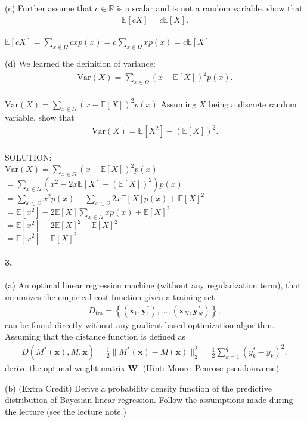 \documentclass{article}
\newcommand{\vect}[1]{\mathbf{#1}}
\newcommand{\matr}[1]{\mathbf{#1}}
\newcommand{\vx}[0]{\vect{x}}
\newcommand{\vy}[0]{\vect{y}}
\newcommand{\mW}[0]{\matr{W}}
\newcommand{\RR}[0]{\mathbb{R}}
\newcommand{\E}[0]{\mathbb{E}}
\newcommand{\tra}{\text{tra}}
\begin{document}
(c) Further assume that $c \in \RR$ is a scalar and is not a random variable, show
that
\begin{align*}
    \E\left[ cX \right] = c\E\left[X\right].
\end{align*}
\\
$\E\left[ cX \right] = \sum_{x \in \Omega} cx p(x) = c \sum_{x \in \Omega} x p(x) = c\E\left[X\right] $
\vspace{15mm}

(d) We learned the definition of variance:
\begin{align*}
    \text{Var}(X) = \sum_{x \in \Omega} (x - \E\left[ X \right])^2 p(x).
\end{align*}
\\
$\text{Var}(X) = \sum_{x \in \Omega} (x - \E\left[ X \right])^2 p(x)$
Assuming $X$ being a discrete random variable, show that
\begin{align*}
    \text{Var}(X) = \E\left[ X^2 \right] - \left(\E\left[ X \right]\right)^2.
\end{align*}
\\
SOLUTION: \\
$ \text{Var}(X) = \sum_{x \in \Omega} (x - \E\left[ X \right])^2 p(x)$ \\
$ = \sum_{x \in \Omega} (x^2 - 2x \E\left[ X \right] + (\E\left[ X \right])^2) p(x)$ \\
$= \sum_{x \in \Omega} x^2 p(x) - \sum_{x \in \Omega} 2x \E\left[ X \right] p(x) + \E\left[ X \right]^2 $ \\
$ = \E\left[  x^2 \right] - 2 \E\left[ X \right] \sum_{x \in \Omega} x  p(x) + \E\left[ X \right]^2$ \\
$= \E\left[  x^2 \right] - 2 \E\left[ X \right]^2 + \E\left[ X \right]^2$ \\
$= \E\left[  x^2 \right] - \E\left[ X \right]^2$
\newpage

\paragraph{3.} 

(a) An optimal linear regression machine (without any regularization term), that
minimizes the empirical cost function given a training set 
\begin{align*}
    D_{\tra} = \left\{ 
        (\vx_1, \vy_1^*), \ldots, (\vx_N, \vy_N^*)
    \right\},
\end{align*}
can be found directly without any gradient-based optimization algorithm.
Assuming that the distance function is defined as 
\begin{align*}
    D(M^*(\vx), M, \vx) = \frac{1}{2} \|M^*(\vx) - M(\vx)\|_2^2 = 
    \frac{1}{2} \sum_{k=1}^q (y^*_k - y_k)^2,
\end{align*}
derive the optimal weight matrix $\mW$. (Hint: Moore–Penrose pseudoinverse)


\vspace{15mm}

(b) (Extra Credit) Derive a  probability density function of the predictive distribution of
Bayesian linear regression. Follow the assumptions made during the lecture (see
the lecture note.) 








%
%
\end{document}
